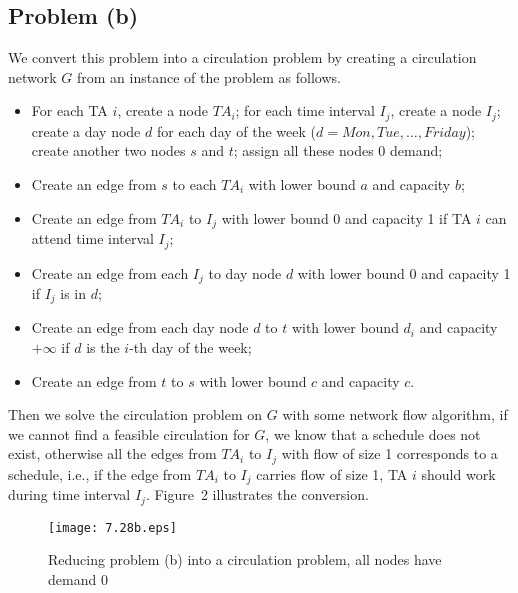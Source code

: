 \documentclass[12pt,letterpaper]{article}
\begin{document}
\subsection*{Problem (b)}
We convert this problem into a circulation problem by creating a circulation network $G$ from an instance of the problem as follows.
\begin{itemize}
\item For each TA $i$, create a node $TA_i$; for each time interval $I_j$, create a node $I_j$; create a day node $d$ for each day of the week ($d=Mon, Tue, \dots, Friday$); create another two nodes $s$ and $t$; assign all these nodes 0 demand;
\item Create an edge from $s$ to each $TA_i$ with lower bound $a$ and capacity $b$;
\item Create an edge from $TA_i$ to $I_j$ with lower bound 0 and capacity 1 if TA $i$ can attend time interval $I_j$;
\item Create an edge from each $I_j$ to day node $d$ with lower bound 0 and capacity 1 if $I_j$ is in $d$;
\item Create an edge from each day node $d$ to $t$ with lower bound $d_i$ and capacity $+\infty$ if $d$ is the $i$-th day of the week;
\item Create an edge from $t$ to $s$ with lower bound $c$ and capacity $c$.
\end{itemize}
Then we solve the circulation problem on $G$ with some network flow algorithm, if we cannot find a feasible circulation for $G$, we know that a schedule does not exist, otherwise all the edges from $TA_i$ to $I_j$ with flow of size 1 corresponds to a schedule, i.e., if the edge from $TA_i$ to $I_j$ carries flow of size 1, TA $i$ should work during time interval $I_j$. Figure~2 illustrates the conversion.
\begin{figure}
\begin{center}
\texttt{[image: 7.28b.eps]}
\caption{Reducing problem (b) into a circulation problem, all nodes have demand 0}
\end{center}
\end{figure}
\end{document}
